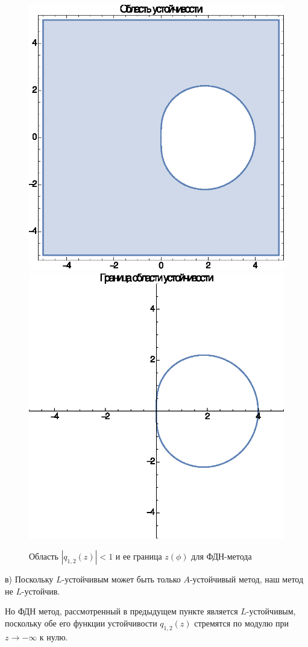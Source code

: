 \documentclass[12pt]{article}
\begin{document}
\begin{figure}[ht!]
\centering
\includegraphics[width=.45\textwidth]{test2_gr1.eps}\quad%
\includegraphics[width=.45\textwidth]{test2_gr2.eps}
\caption{Область $|q_{1,2}(z)| < 1$ и ее граница $z(\phi)$ для ФДН-метода}
\end{figure}

в) Поскольку $L$-устойчивым может быть только $A$-устойчивый метод, наш метод не $L$-устойчив.

Но ФДН метод, рассмотренный в предыдущем пункте является $L$-устойчивым, поскольку обе его функции устойчивости $q_{1,2}(z)$ стремятся по модулю при $z \rightarrow -\infty$ к нулю.
\end{document}
